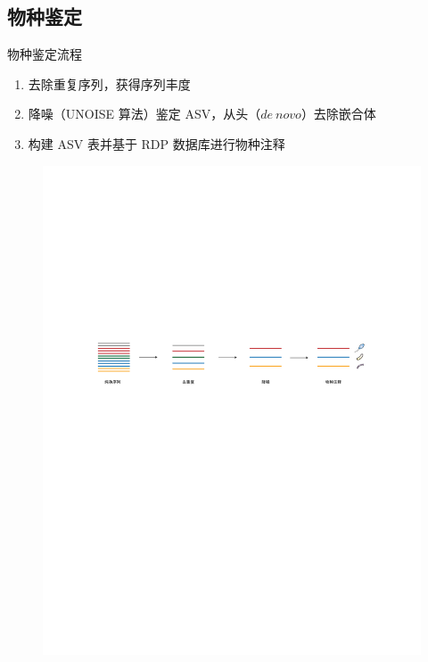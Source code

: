 \documentclass[UTF8]{ctexbeamer}
\begin{document}
	\subsection{物种鉴定}
	\begin{frame}{物种鉴定}{流程}

		\begin{enumerate}
			\item 去除重复序列，获得序列丰度
			\item 降噪（UNOISE 算法）鉴定 ASV，从头（$de~novo$）去除嵌合体
			\item 构建 ASV 表并基于 RDP 数据库进行物种注释
		\end{enumerate}

		\begin{figure}
			\centering
			\includegraphics[width=\textwidth]{img/分析流程.pdf}
		\end{figure}
		

	\end{frame}

\end{document}
